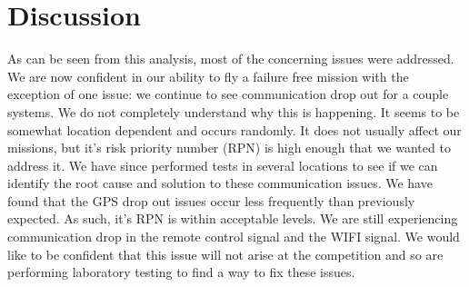 \documentclass[]{auvsi_doc}
\begin{document}
\section{Discussion}
As can be seen from this analysis, most of the concerning issues were addressed. We are now confident in our ability to fly a failure free mission with the exception of one issue: we continue to see communication drop out for a couple systems. We do not completely understand why this is happening. It seems to be somewhat location dependent and occurs randomly. It does not usually affect our missions, but it's risk priority number (RPN) is high enough that we wanted to address it. We have since performed tests in several locations to see if we can identify the root cause and solution to these communication issues. We have found that the GPS drop out issues occur less frequently than previously expected. As such, it's RPN is within acceptable levels. We are still experiencing communication drop in the remote control signal and the WIFI signal. We would like to be confident that this issue will not arise at the competition and so are performing laboratory testing to find a way to fix these issues.
\end{document}
